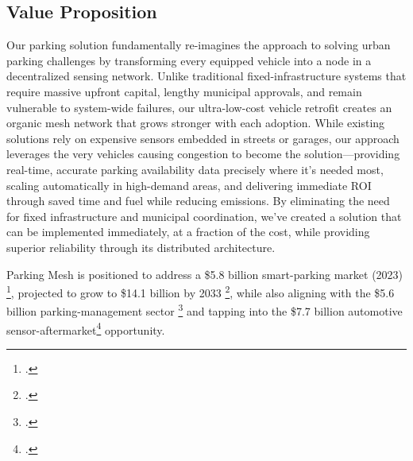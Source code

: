 \subsection{Value Proposition}
Our parking solution fundamentally re-imagines the approach to solving urban parking challenges by transforming every equipped vehicle into a node in a decentralized sensing network. Unlike traditional fixed-infrastructure systems that require massive upfront capital, lengthy municipal approvals, and remain vulnerable to system-wide failures, our ultra-low-cost vehicle retrofit creates an organic mesh network that grows stronger with each adoption.
While existing solutions rely on expensive sensors embedded in streets or garages, our approach leverages the very vehicles causing congestion to become the solution—providing real-time, accurate parking availability data precisely where it's needed most, scaling automatically in high-demand areas, and delivering immediate ROI through saved time and fuel while reducing emissions. By eliminating the need for fixed infrastructure and municipal coordination, we've created a solution that can be implemented immediately, at a fraction of the cost, while providing superior reliability through its distributed architecture.

Parking Mesh is positioned to address a \$5.8 billion smart-parking market (2023) \footcite{MarketResearchFuture2032}, projected to grow to \$14.1 billion by 2033 \footcite{MarketResearchFuture2032}, while also aligning with the \$5.6 billion parking-management sector \footcite{StraitsResearch2033} and tapping into the \$7.7 billion automotive sensor-aftermarket\footcite{GrandViewResearch2030} opportunity.
